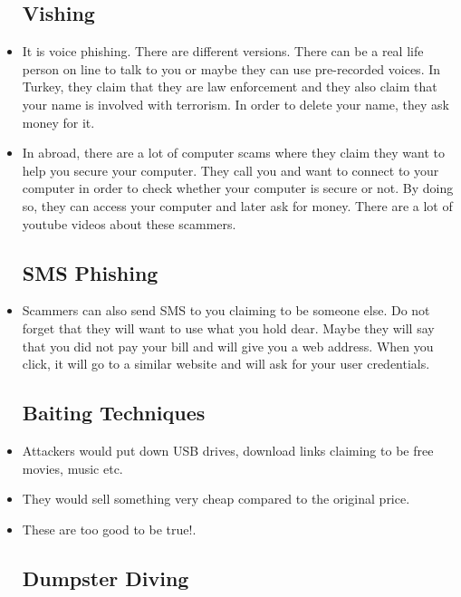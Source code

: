 \documentclass[12pt]{article}
\newcommand{\blue}[1]{{\color{blue} #1}}
\begin{document}
\begin{itemize}[itemsep=3em]
	\subsection{Vishing}
	
	\item It is voice phishing. There are different versions. There can be a real life person on line to talk to you or maybe they can use pre-recorded voices. In Turkey, they claim that they are law enforcement and they also claim that your name is involved with terrorism. In order to delete your name, they ask money for it.
	
	\item In abroad, there are a lot of computer scams where they claim they want to help you secure your computer. They call you and want to connect to your computer in order to check whether your computer is secure or not. By doing so, they can access your computer and later ask for money. \small \blue{There are a lot of youtube videos about these scammers.}
	
	\LARGE
	
	\subsection{SMS Phishing}

	\item Scammers can also send SMS to you claiming to be someone else. Do not forget that they will want to use what you hold dear. Maybe they will say that you did not pay your bill and will give you a web address. When you click, it will go to a similar website and will ask for your user credentials.
	
	\subsection{Baiting Techniques}
	
	\item Attackers would put down USB drives, download links claiming to be free movies, music etc.
	
	\item They would sell something very cheap compared to the original price. 
	
	\item These are too good to be true!.
	
	\subsection{Dumpster Diving}


\end{itemize}
\end{document}
